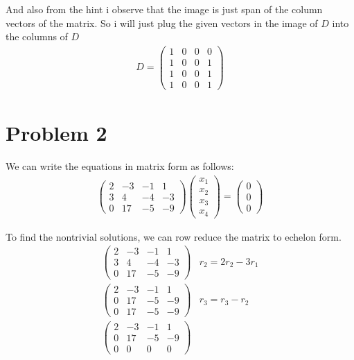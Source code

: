 \documentclass{article}
\begin{document}
And also from the hint i observe that the image is just span of the column vectors of the matrix. So i will just plug the given vectors in the image of \(D\)
into the columns of \(D\)
\begin{align*}
D = \begin{pmatrix}
1 & 0 & 0 & 0 \\
1 & 0 & 0 & 1 \\
1 & 0 & 0 & 1 \\
1 & 0 & 0 & 1
\end{pmatrix}
\end{align*}

\section*{Problem 2}
We can write the equations in matrix form as follows:
\begin{align*}
\begin{pmatrix}
2 & -3 & -1 & 1 \\
3 & 4 & -4 & -3 \\
0 & 17 & -5 & -9
\end{pmatrix}
\begin{pmatrix}
x_1 \\
x_2 \\
x_3 \\
x_4
\end{pmatrix}
=
\begin{pmatrix}
0 \\
0 \\
0
\end{pmatrix}
\end{align*}

To find the nontrivial solutions, we can row reduce the matrix to echelon form.
\begin{align*}
\begin{pmatrix}
2 & -3 & -1 & 1 \\
3 & 4 & -4 & -3 \\
0 & 17 & -5 & -9
\end{pmatrix} & r_2 = 2r_2 - 3r_1 \\
\begin{pmatrix}
2 & -3 & -1 & 1 \\
0 & 17 & -5 & -9 \\
0 & 17 & -5 & -9
\end{pmatrix} & r_3 = r_3 - r_2 \\
\begin{pmatrix}
2 & -3 & -1 & 1 \\
0 & 17 & -5 & -9 \\
0 & 0 & 0 & 0
\end{pmatrix}
\end{align*}
\end{document}
